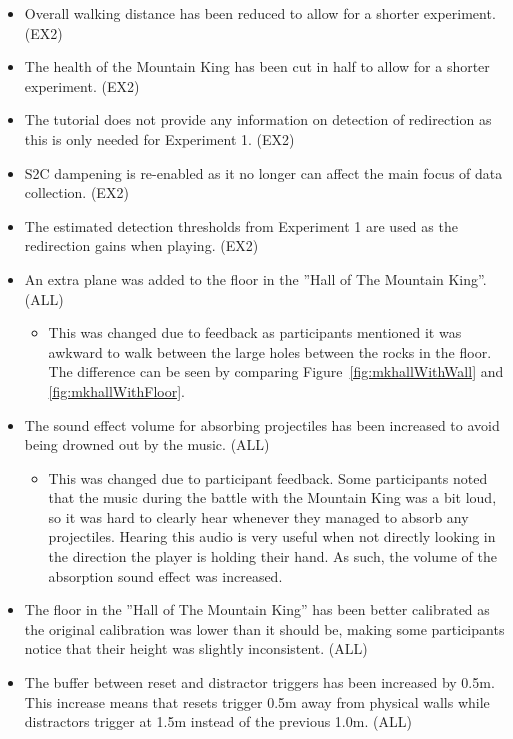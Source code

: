 \begin{itemize}
    \item Overall walking distance has been reduced to allow for a shorter experiment. (EX2)
    \item The health of the Mountain King has been cut in half to allow for a shorter experiment. (EX2)
    \item The tutorial does not provide any information on detection of redirection as this is only needed for Experiment 1. (EX2)
    \item S2C dampening is re-enabled as it no longer can affect the main focus of data collection. (EX2)
    \item The estimated detection thresholds from Experiment 1 are used as the redirection gains when playing. (EX2)
    \item An extra plane was added to the floor in the ''Hall of The Mountain King''. (ALL)
    \begin{itemize}
        \item This was changed due to feedback as participants mentioned it was awkward to walk between the large holes between the rocks in the floor. The difference can be seen by comparing Figure~\ref{fig:mkhallWithWall} and \ref{fig:mkhallWithFloor}.
    \end{itemize}
    \item The sound effect volume for absorbing projectiles has been increased to avoid being drowned out by the music. (ALL)
    \begin{itemize}
        \item This was changed due to participant feedback. Some participants noted that the music during the battle with the Mountain King was a bit loud, so it was hard to clearly hear whenever they managed to absorb any projectiles. Hearing this audio is very useful when not directly looking in the direction the player is holding their hand. As such, the volume of the absorption sound effect was increased.
    \end{itemize}
    \item The floor in the ''Hall of The Mountain King'' has been better calibrated as the original calibration was lower than it should be, making some participants notice that their height was slightly inconsistent. (ALL)
    \item The buffer between reset and distractor triggers has been increased by 0.5m. This increase means that resets trigger 0.5m away from physical walls while distractors trigger at 1.5m instead of the previous 1.0m. (ALL)

\end{itemize}
